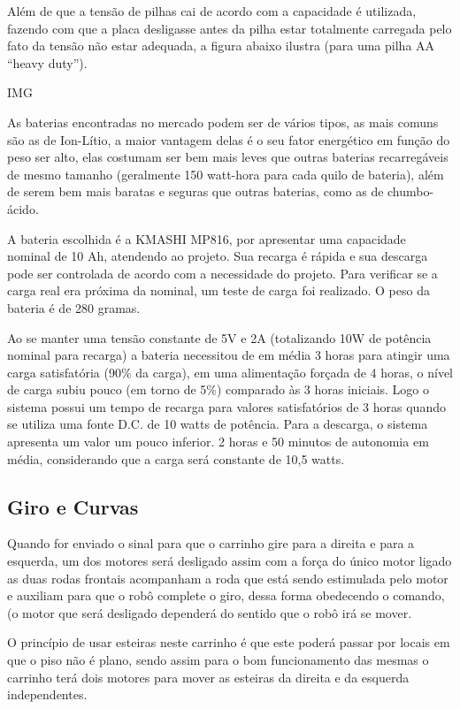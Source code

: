 Além de que a tensão de pilhas cai de acordo com a capacidade é utilizada, fazendo com que a placa desligasse antes da pilha estar totalmente carregada pelo fato da tensão não estar adequada, a figura abaixo ilustra (para uma pilha AA “heavy duty”).

IMG

As baterias encontradas no mercado podem ser de vários tipos, as mais comuns são as de Ion-Lítio, a maior vantagem delas é o seu fator energético em função do peso ser alto, elas costumam ser bem mais leves que outras baterias recarregáveis de mesmo tamanho (geralmente 150 watt-hora para cada quilo de bateria), além de serem bem mais baratas e seguras que outras baterias, como as de chumbo-ácido.

A bateria escolhida é a KMASHI MP816, por apresentar uma capacidade nominal de 10 Ah, atendendo ao projeto. Sua recarga é rápida e sua descarga pode ser controlada de acordo com a necessidade do projeto.  Para verificar se a carga real era próxima da nominal, um teste de carga foi realizado. O peso da bateria é de 280 gramas.

Ao se manter uma tensão constante de 5V e 2A (totalizando 10W de potência nominal para recarga) a bateria necessitou de em média 3 horas para atingir uma carga satisfatória (90\% da carga), em uma alimentação forçada de 4 horas, o nível de carga subiu pouco (em torno de 5\%) comparado às 3 horas iniciais. Logo o sistema possui um tempo de recarga para valores satisfatórios de 3 horas quando se utiliza uma fonte D.C. de 10 watts de potência. Para a descarga, o sistema apresenta um valor um pouco inferior. 2 horas e 50 minutos de autonomia em média, considerando que a carga será constante de 10,5 watts.

\subsection{Giro e Curvas}

Quando for enviado o sinal para que o carrinho gire para a direita e para a esquerda, um dos motores será desligado assim com a força do único motor ligado as duas rodas frontais acompanham a roda que está sendo estimulada pelo motor e auxiliam para que o robô complete o giro, dessa forma obedecendo o comando, (o motor que será desligado dependerá do sentido que o robô irá se mover.
 
O princípio de usar esteiras neste carrinho é que este poderá passar por locais em que o piso não é plano, sendo assim para o bom funcionamento das mesmas o carrinho terá dois motores  para mover as esteiras da direita e da esquerda independentes. 

